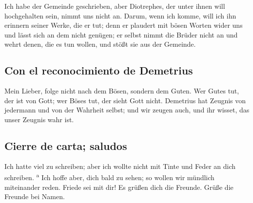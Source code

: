  Ich habe der Gemeinde geschrieben, aber Diotrephes, der
unter ihnen will hochgehalten sein, nimmt uns nicht an. 
Darum, wenn ich komme, will ich ihn erinnern seiner Werke, die er tut;
denn er plaudert mit bösen Worten wider uns und lässt sich an dem nicht
genügen; er selbst nimmt die Brüder nicht an und wehrt denen, die es tun
wollen, und stößt sie aus der Gemeinde.

\hypertarget{con-el-reconocimiento-de-demetrius}{%
\subsection{Con el reconocimiento de
Demetrius}\label{con-el-reconocimiento-de-demetrius}}

 Mein Lieber, folge nicht nach dem Bösen, sondern dem
Guten. Wer Gutes tut, der ist von Gott; wer Böses tut, der sieht Gott
nicht.  Demetrius hat Zeugnis von jedermann und von der
Wahrheit selbst; und wir zeugen auch, und ihr wisset, das unser Zeugnis
wahr ist.

\hypertarget{cierre-de-carta-saludos}{%
\subsection{Cierre de carta; saludos}\label{cierre-de-carta-saludos}}

 Ich hatte viel zu schreiben; aber ich wollte nicht mit
Tinte und Feder an dich schreiben. \textsuperscript{a} 
Ich hoffe aber, dich bald zu sehen; so wollen wir mündlich miteinander
reden.  Friede sei mit dir! Es grüßen dich die Freunde.
Grüße die Freunde bei Namen.
